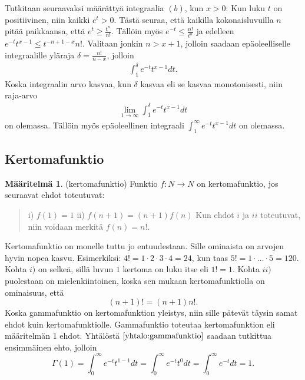 \documentclass[12pt]{article}
\theoremstyle{definition}
\newtheorem{maar}{Määritelmä}
\theoremstyle{plain}
\begin{document}
Tutkitaan seuraavaksi määrättyä integraalia $(b)$, kun $x>0$: \newline
Kun luku $t$ on positiivinen, niin kaikki $e^t>0$. Tästä seuraa, että kaikilla kokonaisluvuilla $n$ pitää paikkaansa, että $e^t\ge\frac{t^n}{n!}$. Tällöin myös $e^{-t}\le\frac{n!}{t^n}$ ja edelleen $e^{-t}t^{x-1}\le{t^{-{n+1-x}}}{n!}$. Valitaan jonkin $n>x+1$, jolloin saadaan epäoleelliselle integraalille yläraja $\delta=\frac{n!}{n-x}$, jolloin
\begin{align*}
    \int_1^{\delta}e^{-t}t^{x-1}dt.
\end{align*}
Koska integraalin arvo kasvaa, kun $\delta$ kasvaa eli se kasvaa monotonisesti, niin raja-arvo 
\begin{align*}
    \lim_{1\to\infty}\int_1^{\delta}e^{-t}t^{x-1}dt
\end{align*}
on olemassa. Tällöin myös epäoleellinen integraali $\int_1^{\infty}e^{-t}t^{x-1}dt$ on olemassa.



\subsection{Kertomafunktio}
\begin{maar}
(kertomafunktio)
Funktio $f: N \rightarrow N$ on kertomafunktio, jos seuraavat ehdot toteutuvat:
\begin{quote}
    i) $f(1)=1$ \newline
    ii) $f(n+1)=(n+1)f(n)$ \newline
    Kun ehdot $i$ ja $ii$ toteutuvat, niin voidaan merkitä $f(n)=n!$.
\end{quote}
\end{maar}
Kertomafunktio on monelle tuttu jo entuudestaan. Sille ominaista on arvojen hyvin nopea kasvu. Esimerkiksi: $4! = 1\cdot 2\cdot3\cdot4=24$, kun taas $5! = 1\cdot\dots\cdot5=120$.
Kohta $i)$ on selkeä, sillä luvun $1$ kertoma on luku itse eli $1!=1$. Kohta $ii)$ puolestaan on mielenkiintoinen, koska sen mukaan kertomafunktiolla on ominaisuus, että 
\begin{equation}
    (n+1)! = (n+1)n!.
\end{equation}
Koska gammafunktio on kertomafunktion yleistys, niin sille pätevät täysin samat ehdot kuin kertomafunktiolle.
Gammafunktio toteutaa kertomafunktion eli määritelmän 1 ehdot. Yhtälöstä $\eqref{yhtalo:gammafunktio}$ saadaan tutkittua ensimmäinen ehto, jolloin
\begin{equation*}
    \Gamma(1)=\int_0^\infty e^{-t}t^{1-1}dt=\int_0^\infty e^{-t}t^{0}dt = \int_0^\infty e^{-t}dt = 1.
\end{equation*}
\end{document}
